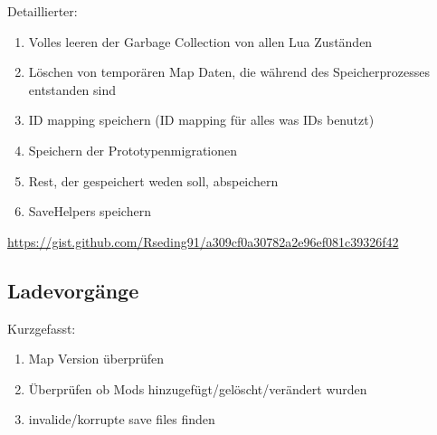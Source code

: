 Detaillierter:
\begin{enumerate}
    \item Volles leeren der Garbage Collection von allen Lua Zuständen
    \item Löschen von temporären Map Daten, die während des Speicherprozesses entstanden sind
    \item ID mapping speichern (ID mapping für alles was IDs benutzt)
    \item Speichern der Prototypenmigrationen
    \item Rest, der gespeichert weden soll, abspeichern
    \item SaveHelpers speichern
\end{enumerate}
\url{https://gist.github.com/Rseding91/a309cf0a30782a2e96ef081c39326f42}

\subsection{Ladevorgänge}
Kurzgefasst:
\begin{enumerate}
    \item Map Version überprüfen
    \item Überprüfen ob Mods hinzugefügt/gelöscht/verändert wurden
    \item invalide/korrupte save files finden 
\end{enumerate}

